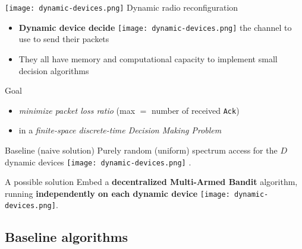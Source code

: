 \begin{frameO}
\begin{colorblock}{\texttt{[image: dynamic-devices.png]}  Dynamic radio reconfiguration}
        \begin{itemize}
            \item
                \textbf{Dynamic device decide} \texttt{[image: dynamic-devices.png]}  the channel to use to send their packets
            \item
                They all have memory and computational capacity to implement small decision algorithms
        \end{itemize}

    \end{colorblock}

\end{frameO}


\begin{frameO}[Problem]

    \begin{lightblock}{Goal}
        \begin{itemize}
            \item
            \emph{minimize packet loss ratio} (max \(=\) number of received \texttt{Ack})\\
            \item
            in a \emph{finite-space discrete-time Decision Making Problem}
        \end{itemize}
    \end{lightblock}

    \vspace*{20pt}

    \begin{colorblock}{Baseline (naive solution)}
        Purely random (uniform) spectrum access for the $D$ dynamic devices \texttt{[image: dynamic-devices.png]} .
    \end{colorblock}

    \begin{darkblock}{A possible solution}
        Embed a \textbf{decentralized Multi-Armed Bandit} algorithm, running \textbf{independently on each dynamic device} \texttt{[image: dynamic-devices.png]}.
    \end{darkblock}

\end{frameO}



\subsection{Baseline algorithms}

